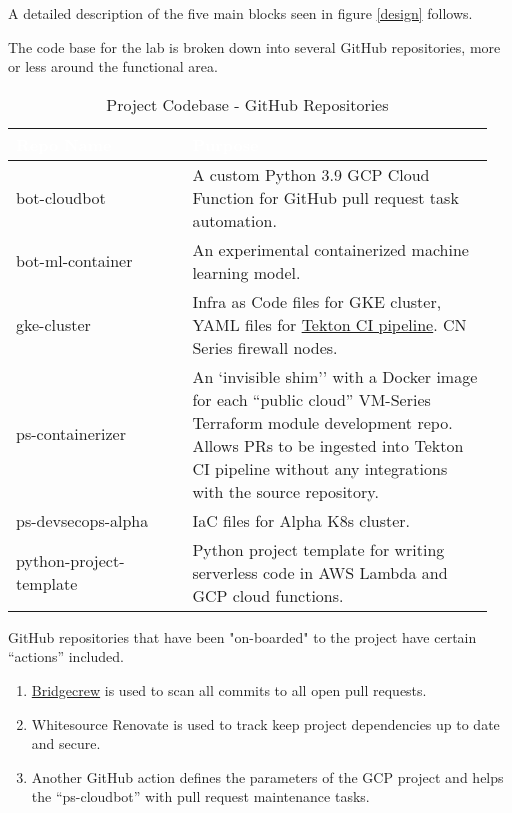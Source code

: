 \justifying
A detailed description of the five main blocks seen in figure \ref{design} follows.

\newpage
{}

\justifying
The code base for the lab is broken down into several GitHub repositories, more or less around the functional area. 

\begin{table}[ht]
    \centering
	\begin{tabular}{| p{0.35\linewidth} | p{0.6\linewidth} |} \hline
		\cellcolor{myblue}\textcolor{white}{Repo Name} & \cellcolor{myblue}\textcolor{white}{Purpose} \\\hline
		bot-cloudbot     & A custom Python 3.9 GCP Cloud Function for GitHub pull request task automation.\\\hline
		bot-ml-container & An experimental containerized machine learning model.\\\hline
		gke-cluster      & Infra as Code files for GKE cluster, YAML files for \href{https://tekton.dev/}{Tekton CI pipeline}. CN Series firewall nodes.\\\hline
		ps-containerizer & An `invisible shim'' with a Docker image for each ``public cloud'' VM-Series Terraform module development repo. Allows PRs to be
		ingested into Tekton CI pipeline without any integrations with the source repository.\\\hline
		ps-devsecops-alpha & IaC files for Alpha K8s cluster.\\\hline
		python-project-template & Python project template for writing serverless code in AWS Lambda and GCP cloud functions.\\\hline
	\end{tabular}
	\caption{Project Codebase - GitHub Repositories}
    \label{mytable:1}
\end{table}
\vspace{2mm}
\vspace{2mm}
\justifying
GitHub repositories that have been "on-boarded" to the project have certain ``actions'' included.

\begin{raggedright}
	\begin{enumerate}
        \item \href{https://docs.bridgecrew.io/docs}{Bridgecrew} is used to scan all commits to all open pull requests.
        \item Whitesource Renovate is used to track keep project dependencies up to date and secure.
        \item Another GitHub action defines the parameters of the GCP project and helps the ``ps-cloudbot'' with pull request  maintenance tasks.
	\end{enumerate}
\end{raggedright}
\vspace{2mm}


